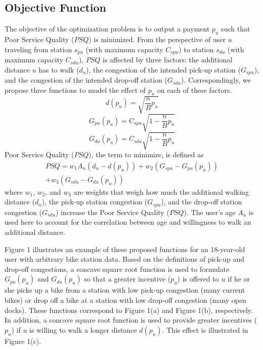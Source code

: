 \documentclass[times, 10pt,twocolumn]{article}
\begin{document}
\subsection{Objective Function}
 
The objective of the optimization problem is to output a payment $p_u$ such that Poor Service Quality ($PSQ$) is minimized. From the perspective of user $u$ traveling from station $s_{pu}$ (with maximum capacity $C_{spu}$) to station $s_{du}$ (with maximum capacity $C_{sdu}$), $PSQ$ is affected by three factors: the additional distance $u$ has to walk ($d_u$), the congestion of the intended pick-up station ($G_{spu}$), and the congestion of the intended drop-off station ($G_{sdu}$). Correspondingly, we propose three functions to model the effect of $p_u$ on each of these factors.
\begin{equation}
d(p_u) = \sqrt{\frac{n}{B}p_u}
\end{equation}
\begin{equation}
G_{pu}(p_u) = C_{spu}\sqrt{1-\frac{n}{B}p_u}
\end{equation}
\begin{equation}
G_{du}(p_u) = C_{sdu}\sqrt{1-\frac{n}{B}p_u}
\end{equation}
Poor Service Quality ($PSQ$), the term to minimize, is defined as
\begin{equation}
\begin{split}
PSQ = w_1A_u(d_u - d(p_u)) + w_2(G_{spu} - G_{pu}(p_u)) \\ + w_3(G_{sdu} - G_{du}(p_u))
\end{split}
\end{equation}
where $w_1$, $w_2$, and $w_3$ are weights that weigh how much the additional walking distance ($d_u$), the pick-up station congestion ($G_{spu}$), and the drop-off station congestion ($G_{sdu}$) increase the Poor Service Quality ($PSQ$). The user's age $A_u$ is used here to account for the correlation between age and willingness to walk an additional distance.

Figure 1 illustrates an example of these proposed functions for an 18-year-old user with arbitrary bike station data. Based on the definitions of pick-up and drop-off congestions, a concave square root function is used to formulate $G_{pu}(p_u)$ and $G_{du}(p_u)$ so that a greater incentive ($p_u$) is offered to $u$ if he or she picks up a bike from a station with low pick-up congestion (many current bikes) or drop off a bike at a station with low drop-off congestion (many open docks). These functions correspond to Figure 1(a) and Figure 1(b), respectively. In addition, a concave square root function is used to provide greater incentives ($p_u$) if $u$ is willing to walk a longer distance $d(p_u)$. This effect is illustrated in Figure 1(c).
\end{document}
